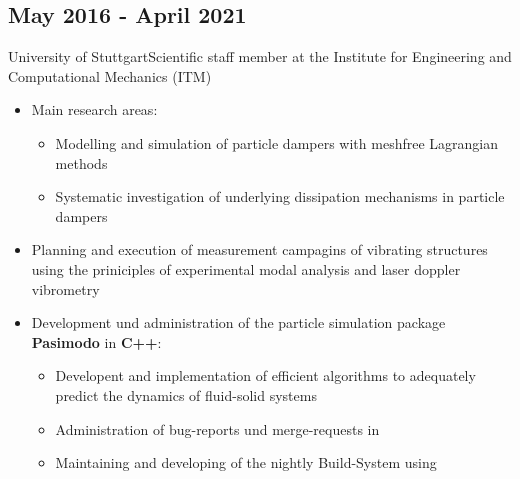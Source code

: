 \documentclass{mycv}
\begin{document}
\begin{paracol}{2}
\switchcolumn
{}%

\subsection{May 2016 - April 2021}{University of
Stuttgart}{Scientific staff member at the Institute for Engineering and
	Computational Mechanics (ITM)}
	  \begin{itemize}
			\item  Main research areas: 
				\begin{itemize}
					\item Modelling and simulation of particle dampers with
						meshfree Lagrangian methods
			    \item Systematic investigation of underlying dissipation mechanisms in
						particle dampers  
		\end{itemize}
			\item Planning and execution of measurement campagins of
				vibrating structures using the priniciples of experimental modal analysis
				and laser doppler vibrometry
			\item Development und administration of the particle simulation package 
			{\bfseries \,Pasimodo} in {\bfseries C++}:
			\begin{itemize}
				\item Developent and implementation of efficient algorithms to adequately
					predict the dynamics of fluid-solid systems
				\item Administration of bug-reports und merge-requests in
					\href{https://about.gitlab.com/}{}
				\item Maintaining and developing of the nightly Build-System using

\end{itemize}
\end{itemize}
\end{paracol}
\end{document}
